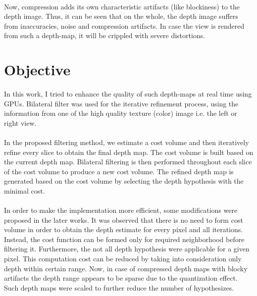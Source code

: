 \paragraph {}
Now, compression adds its own characteristic artifacts (like blockiness) to the depth image. Thus, it can be seen that on the whole, the depth image suffers from inaccuracies, noise and compression artifacts. In case the view is rendered from such a depth-map, it will be crippled with severe distortions.

  
\section{Objective}

\paragraph {}
In this work, I tried to enhance the quality of such depth-maps at real time using GPUs. Bilateral filter was used for the iterative refinement process, using the information from one of the high quality texture (color) image i.e. the left or right view. 

\paragraph {}
In the proposed filtering method, we estimate a cost volume and then iteratively refine every slice to obtain the final depth map. The cost volume is built based on the current depth map. Bilateral filtering is then performed throughout each slice of the cost volume to produce a new cost volume. The refined depth map is generated based on the cost volume by selecting the depth hypothesis with the minimal cost.

\paragraph {}
In order to make the implementation more efficient, some modifications were proposed in the later works. It was observed that there is no need to form cost volume in order to obtain the depth estimate for every pixel and all iterations. Instead, the cost function can be formed only for required neighborhood before filtering it. Furthermore, the not all depth hypothesis were applicable for a given pixel. This computation cost can be reduced by taking into consideration only depth within certain range. Now, in case of compressed depth maps with blocky artifacts the depth range appears to be sparse due to the quantization effect. Such depth maps were scaled to further reduce the number of hypothesizes. 

